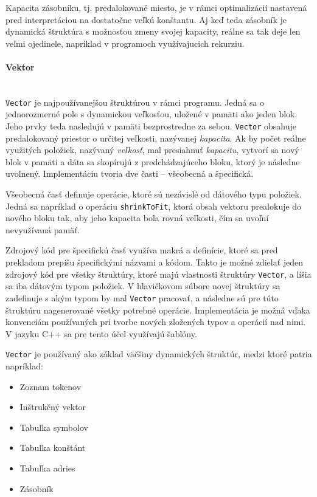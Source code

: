 \documentclass[12pt,a4paper,titlepage,final]{article}
\begin{document}
Kapacita zásobníku, tj. predalokované miesto, je v rámci optimalizácií nastavená pred
interpretáciou na dostatočne veľkú konštantu. Aj keď teda zásobník je dynamická štruktúra
s možnosťou zmeny svojej kapacity, reálne sa tak deje len veľmi ojedinele, napríklad v programoch
využívajucich rekurziu.

\paragraph{Vektor}\mbox{}\\

\texttt{Vector} je najpoužívanejšou štruktúrou v rámci programu. Jedná sa o jednorozmerné pole s
dynamickou veľkosťou, uložené v pamäti ako jeden blok. Jeho prvky teda nasledujú v pamäti bezprostredne
za sebou. \texttt{Vector} obsahuje predalokovaný priestor o určitej veľkosti, nazývanej {\em kapacita}.
Ak by počet reálne využitých položiek, nazývaný {\em veľkosť}, mal presiahnuť {\em kapacitu}, vytvorí
sa nový blok v pamäti a dáta sa skopírujú z predchádzajúceho bloku, ktorý je následne uvoľnený.
Implementáciu tvoria dve časti -- všeobecná a špecifická.

Všeobecná časť definuje operácie, ktoré sú nezávislé od dátového typu položiek. Jedná sa napríklad
o operáciu \texttt{shrinkToFit}, ktorá obsah vektoru prealokuje do nového bloku tak, aby jeho
kapacita bola rovná veľkosti, čím sa uvoľní nevyužívaná pamäť. 

Zdrojový kód pre špecifickú časť využíva makrá a definície, ktoré sa pred prekladom prepíšu
špecifickými názvami a kódom. Takto je možné zdielať jeden zdrojový kód pre všetky štruktúry,
ktoré majú vlastnosti štruktúry \texttt{Vector}, a líšia sa iba dátovým typom položiek. V hlavičkovom
súbore novej štruktúry sa zadefinuje s akým typom by mal \texttt{Vector} pracovať, 
a následne sú pre túto štruktúru nagenerované všetky potrebné operácie. Implementácia je možná vďaka
konvenciám používaných pri tvorbe nových zložených typov a operácií nad nimi. V jazyku C++ sa pre tento účel
využívajú šablóny.

\texttt{Vector} je používaný ako základ väčšiny dynamických štruktúr, medzi ktoré patria napríklad:
\begin{itemize}
    \itemsep0em
    \item Zoznam tokenov
    \item Inštrukčný vektor
    \item Tabuľka symbolov
    \item Tabuľka konštánt
    \item Tabuľka adries
    \item Zásobník
\end{itemize}
\end{document}
